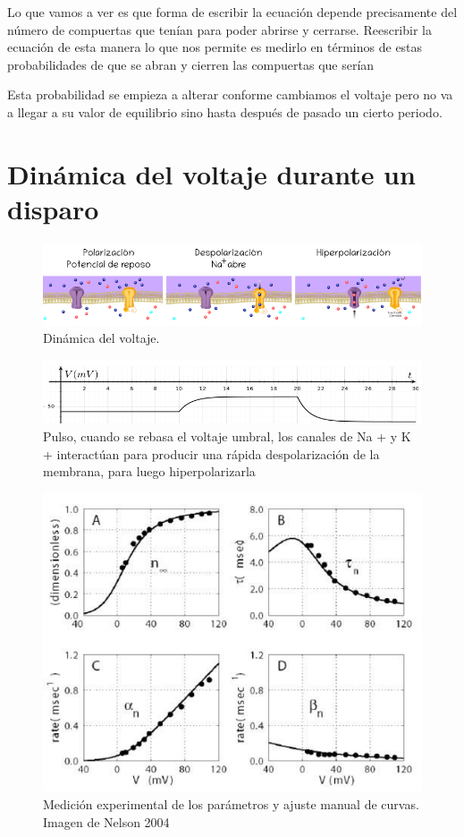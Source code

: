 Lo que vamos a ver es que forma de escribir la ecuación depende precisamente del número de compuertas que tenían para poder abrirse y cerrarse. Reescribir la ecuación de esta manera lo que nos permite es medirlo en términos de estas probabilidades de que se abran y cierren las compuertas que serían 

Esta probabilidad se empieza a alterar conforme cambiamos el voltaje pero no va a llegar a su valor de equilibrio sino hasta después de pasado un cierto periodo.


\section{Dinámica del voltaje durante un disparo} 
\begin{figure}[H]
 \centering
 \includegraphics[scale=0.5]{../Figuras/polarizacion1.png}
 \caption{Dinámica del voltaje.}
 \label{fig:voltaje1}
\end{figure}

\begin{figure}[H]
 \centering
 \includegraphics[scale=0.5]{../Figuras/polarizacion2.png}
 \caption{Pulso, cuando se rebasa el voltaje umbral, los canales de Na + y K + interactúan para producir
una rápida despolarización de la membrana, para luego hiperpolarizarla}
 \label{fig:voltaje1}
\end{figure}

\begin{figure}[H]
 \centering
 \includegraphics[scale=0.5]{../Figuras/medidasExperimentales.png}
 \caption{Medición experimental de los parámetros y ajuste manual de curvas. Imagen de Nelson
2004}
 \label{fig:voltajeAB}
\end{figure}

